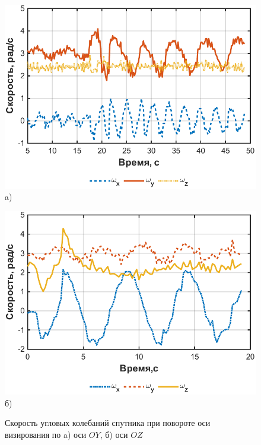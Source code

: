 \begin{figure}[h]
	\begin{minipage}[b][][b]{0.49\linewidth}\centering
		\includegraphics[width=1\linewidth]{matlab/img/sat_gyro_dataY.pdf} \\ a)
	\end{minipage}
	\hfill
	\begin{minipage}[b][][b]{0.49\linewidth}\centering
		\includegraphics[width=1\linewidth]{matlab/img/sat_gyro_dataZ.pdf} \\ б)
	\end{minipage}
	\caption{Скорость угловых колебаний спутника при повороте оси визирования по a) оси $OY$, б) оси $OZ$ }
	\label{fig:rotationYZ}
\end{figure}

